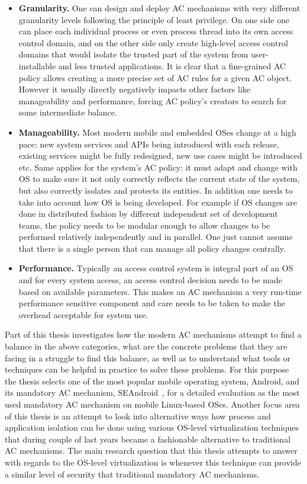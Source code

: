 \begin{itemize}
	\item \textbf{Granularity.} One can design and deploy AC mechanisms with very different granularity levels following the principle of least privilege. On one side one can place each individual process or even process thread into its own access control domain, and on the other side only create high-level access control domains that would isolate the trusted part of the system from user-installable and less trusted applications. It is clear that a fine-grained AC policy allows creating a more precise set of AC rules for a given AC object. However it usually directly negatively impacts other factors like manageability and performance, forcing AC policy's creators to search for some intermediate balance.    
	\item \textbf{Manageability.} Most modern mobile and embedded OSes change at a high pace: new system services and APIs being introduced with each release, existing services might be fully redesigned, new use cases might be introduced etc. Same applies for the system's AC policy: it must adapt and change with OS to make sure it not only correctly reflects the current state of the system, but also correctly isolates and protects its entities. In addition one needs to take into account how OS is being developed. For example if OS changes are done in distributed fashion by different independent set of development teams, the policy needs to be modular enough to allow changes to be performed relatively independently and in parallel. One just cannot assume that there is a single person that can manage all policy changes centrally.  
	\item \textbf{Performance.} Typically an access control system is integral part of an OS and for every system access, an access control decision needs to be made based on available parameters. This makes an AC mechanism a very run-time performance sensitive component and care needs to be taken to make the overhead acceptable for system use. 
\end{itemize}

Part of this thesis investigates how the modern AC mechanisms attempt to find a balance in the above categories, what are the concrete problems that they are facing in a struggle to find this balance, as well as to understand what tools or techniques can be helpful in practice to solve these problems. For this purpose the thesis selects one of the most popular mobile operating system, Android, and its mandatory AC mechanism, SEAndroid~\cite{smalley12}, for a detailed evaluation as the most used mandatory AC mechanism on mobile Linux-based OSes. Another focus area of this thesis is an attempt to look into alternative ways how process and application isolation can be done using various OS-level virtualization  techniques that during couple of last years became a fashionable alternative to traditional AC mechanisms. The main research question that this thesis attempts to answer with regards to the OS-level virtualization is whenever this technique can provide a similar level of security that traditional mandatory AC mechanisms. 


